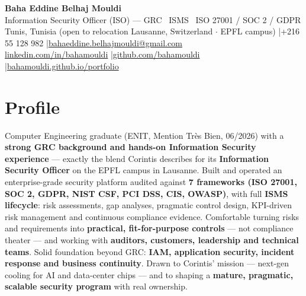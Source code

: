 \documentclass[a4paper,9pt]{article}
\begin{document}
\begin{center}
{\LARGE\bfseries\color{navy} Baha Eddine Belhaj Mouldi}\\[3pt]
{\large Information Security Officer (ISO) --- GRC \textbar\ ISMS \textbar\ ISO 27001 / SOC 2 / GDPR}\\[4pt]
Tunis, Tunisia (open to relocation Lausanne, Switzerland $\cdot$ EPFL campus) \quad|\quad +216 55 128 982 \quad|\quad \href{mailto:bahaeddine.belhajmouldi@gmail.com}{bahaeddine.belhajmouldi@gmail.com}\\[1pt]
\href{https://www.linkedin.com/in/bahamouldi}{linkedin.com/in/bahamouldi} \quad|\quad \href{https://github.com/bahamouldi}{github.com/bahamouldi} \quad|\quad \href{https://bahamouldi.github.io/portfolio/}{bahamouldi.github.io/portfolio}
\end{center}
\vspace{2pt}
\section{Profile}
Computer Engineering graduate (ENIT, Mention Très Bien, 06/2026) with a \textbf{strong GRC background and hands-on Information Security experience} — exactly the blend Corintis describes for its \textbf{Information Security Officer} on the EPFL campus in Lausanne. Built and operated an enterprise-grade security platform audited against \textbf{7 frameworks (ISO 27001, SOC 2, GDPR, NIST CSF, PCI DSS, CIS, OWASP)}, with full \textbf{ISMS lifecycle}: risk assessments, gap analyses, pragmatic control design, KPI-driven risk management and continuous compliance evidence. Comfortable turning risks and requirements into \textbf{practical, fit-for-purpose controls} — not compliance theater — and working with \textbf{auditors, customers, leadership and technical teams}. Solid foundation beyond GRC: \textbf{IAM, application security, incident response and business continuity}. Drawn to Corintis' mission — next-gen cooling for AI and data-center chips — and to shaping a \textbf{mature, pragmatic, scalable security program} with real ownership.
\end{document}
